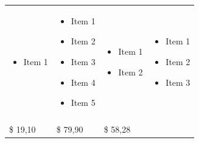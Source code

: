 \documentclass[11pt,a4paper,titlepage]{article}
\begin{document}
\begin{tabular}{| m{92 pt} | m{92 pt} | m{92 pt} | m{92 pt} |}
  \begin{itemize} \tiny \item Item 1 \end{itemize} & 
  \begin{itemize} \tiny 
  \item Item 1
  \item Item 2
  \item Item 3
  \item Item 4
  \item Item 5\end{itemize} & 
    \begin{itemize} \tiny 
    \item Item 1
    \item Item 2\end{itemize}& 
      \begin{itemize} \tiny 
      \item Item 1
      \item Item 2
      \item Item 3 \end{itemize} \\
      & & & \\ \hline
      \$ 19,10 & \$ 79,90 & \$ 58,28 & \\ \hline
\end{tabular}
\end{document}
